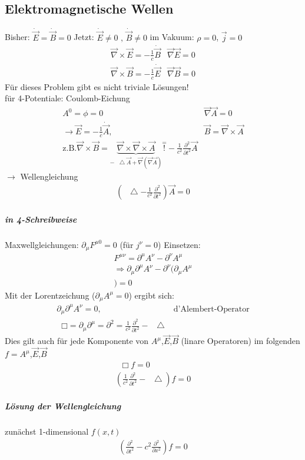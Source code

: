 \documentclass[a4paper]{article}
\newcommand*\laplace{\mathop{}\!\mathbin\bigtriangleup}
\newcommand*\dalembert{\mathop{}\!\mathbin\Box}
\begin{document}
\subsection{Elektromagnetische Wellen}
Bisher: $\dot{\vec{E}}=\dot{\vec{B}}=0$
Jetzt: $\dot{\vec{E}}\neq0\text{ , } \dot{\vec{B}}\neq0$ im Vakuum: $\rho=0$, $\vec{j}=0$
\begin{align}
\vec{\nabla}\times\vec{E}=-\frac{1}{c}\dot{\vec{B}} & \vec{\nabla}\vec{E}=0\\
\vec{\nabla}\times\vec{B}=-\frac{1}{c}\dot{\vec{E}} & \vec{\nabla}\vec{B}=0
\end{align}
Für dieses Problem gibt es nicht triviale Lösungen!\\
für 4-Potentiale: Coulomb-Eichung
\begin{align}
A^0=\phi=0 & \vec{\nabla}\vec{A}=0\\
\rightarrow \vec{E}=-\frac{1}{c}\dot{\vec{A}} \text{,} & \vec{B}=\vec{\nabla}\times\vec{A}\\
\text{z.B.} \vec{\nabla}\times\vec{B}=\underbrace{\vec{\nabla}\times\vec{\nabla}\times\vec{A}}_{-\laplace \vec{A}+\vec{\nabla}(\vec{\nabla}\vec{A})}
\overset{=}{!}-\frac{1}{c^2}\frac{\partial^2}{\partial t^2}\vec{A}
\end{align}
$\rightarrow$ Wellengleichung
\begin{align}
\left(\laplace-\frac{1}{c^2}\frac{\partial^2}{\partial t^2}\right)\vec{A}=0
\end{align}
\subparagraph{in 4-Schreibweise}
Maxwellgleichungen: $\partial_\mu F^{\mu0}=0$ (für $j^\nu=0$)
Einsetzen:
\begin{align}
F^{\mu\nu}=\partial^\mu A^\nu -\partial^\nu A^\mu\\
\Rightarrow \partial_\mu\partial^\mu A^\nu -\partial^\nu (\partial_\mu A^\mu\\)=0
\end{align}
Mit der Lorentzeichung ($\partial_\mu A^\mu=0$) ergibt sich:
\begin{align}
\partial_\mu\partial^\mu A^\nu=0, & \text{d'Alembert-Operator}\\
\dalembert=\partial_\mu\partial^\mu=\partial^2=\frac{1}{c^2}\frac{\partial^2}{\partial t^2}-\laplace
\end{align}
Dies gilt auch für jede Komponente von $A^\mu$,$\vec{E}$,$\vec{B}$ (linare Operatoren) im folgenden $f=A^\mu$,$\vec{E}$,$\vec{B}$
\begin{align}
\dalembert f=0\\
\left(\frac{1}{c^2}\frac{\partial^2}{\partial t^2}-\laplace\right) f=0
\end{align}
\subparagraph{Lösung der Wellengleichung}
zunächst 1-dimensional $f(x,t)$
\begin{align}
\left(\frac{\partial^2}{\partial t^2}-c^2\frac{\partial^2}{\partial x^2}\right) f=0
\end{align}
\end{document}

